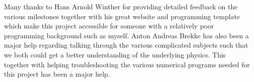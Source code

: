 \documentclass[%
reprint,
 amsmath,amssymb,
 aps,
]{revtex4-2}
\begin{document}
\begin{acknowledgements}
	Many thanks to Hans Arnold Winther for providing detailed feedback on the various milestones together with his great website and programming template which make this project accessible for someone with a relatively poor programming background such as myself. Anton Andreas Brekke has also been a major help regarding talking through the various complicated subjects such that we both could get a better understanding of the underlying physics. This together with helping troubleshooting the various numerical programs needed for this project has been a major help.
\end{acknowledgements}



\end{document}
